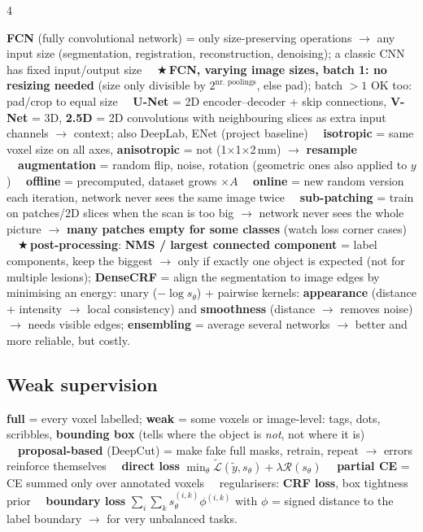 \documentclass[a4paper]{article}
\renewcommand{\section}[1]{\par\vspace{2.5pt}\noindent{\setlength{\fboxsep}{1pt}\colorbox{black}{\parbox{\dimexpr\linewidth-2\fboxsep}{\color{white}\bfseries\strut#1}}}\par\vspace{1pt}}
\newcommand{\K}[1]{\textcolor{kg}{\textbf{#1}}}
\newcommand{\F}[1]{\textcolor{fb}{#1}}
\newcommand{\E}[1]{\textcolor{ep}{#1}}
\newcommand{\T}[1]{\textcolor{tr}{\textbf{#1}}}
\newcommand{\X}{\textcolor{tr}{$\bigstar$}\,}
\newcommand{\D}{\unskip\ \textbf{\textbullet}\ \ignorespaces}
\newcommand{\ra}{\ensuremath{\to}}
\begin{document}
\begin{multicols*}{4}
\section{L4 Segmentation II: practice}
\K{FCN} (fully convolutional network) = only size-preserving operations \ra{} any input size (segmentation, registration, reconstruction, denoising); a classic CNN has fixed input/output size \D \X\T{FCN, varying image sizes, batch 1: no resizing needed} (size only divisible by $2^{\text{nr.\ poolings}}$, else pad); batch $>1$ OK too: pad/crop to equal size \D \K{U-Net} = 2D encoder--decoder + skip connections, \K{V-Net} = 3D, \K{2.5D} = 2D convolutions with neighbouring slices as extra input channels \ra{} context; also DeepLab, ENet (project baseline) \D \K{isotropic} = same voxel size on all axes, \K{anisotropic} = not (\E{1$\times$1$\times$2\,mm}) \ra{} \K{resample} \D \K{augmentation} = random flip, noise, rotation (geometric ones also applied to $y$) \D \K{offline} = precomputed, dataset grows $\times A$ \D \K{online} = new random version each iteration, network never sees the same image twice \D \K{sub-patching} = train on patches/2D slices when the scan is too big \ra{} network never sees the whole picture \ra{} \T{many patches empty for some classes} (watch loss corner cases) \D \X\K{post-processing}: \K{NMS / largest connected component} = label components, keep the biggest \ra{} only if exactly one object is expected (not for multiple lesions); \K{DenseCRF} = align the segmentation to image edges by minimising an energy: unary ($-\log s_\theta$) + pairwise kernels: \K{appearance} (distance + intensity \ra{} local consistency) and \K{smoothness} (distance \ra{} removes noise) \ra{} needs visible edges; \K{ensembling} = average several networks \ra{} better and more reliable, but costly.

\subsection{Weak supervision}
\K{full} = every voxel labelled; \K{weak} = some voxels or image-level: tags, dots, scribbles, \K{bounding box} (tells where the object is \emph{not}, not where it is) \D \K{proposal-based} (DeepCut) = make fake full masks, retrain, repeat \ra{} errors reinforce themselves \D \K{direct loss} \F{$\min_\theta\widetilde{\mathcal L}(\tilde y,s_\theta)+\lambda\mathcal R(s_\theta)$} \D \K{partial CE} = CE summed only over annotated voxels \D regularisers: \K{CRF loss}, box tightness prior \D \K{boundary loss} \F{$\sum_i\sum_k s_\theta^{(i,k)}\phi^{(i,k)}$} with $\phi$ = signed distance to the label boundary \ra{} for very unbalanced tasks.


\end{multicols*}
\end{document}
